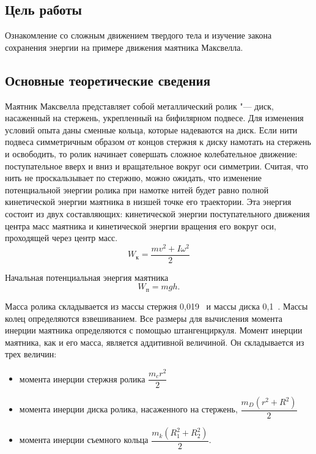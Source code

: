 \documentclass[a4paper, 12pt]{extarticle}
\begin{document}
\MTDTitlePage
\MTDInfoPage

\setcounter{section}{10}

\subsection{Цель работы}
Ознакомление со сложным движением твердого тела и изучение закона сохранения энергии на примере движения маятника Максвелла. 

\subsection{Основные теоретические сведения}
Маятник Максвелла представляет собой металлический ролик "--- диск, насаженный на стержень, укрепленный на бифилярном  подвесе. Для изменения условий опыта даны сменные кольца, которые надеваются на диск. Если нити подвеса симметричным образом от концов стержня к диску намотать на стержень и освободить, то ролик начинает совершать сложное колебательное движение: поступательное вверх и вниз и вращательное вокруг оси симметрии. Считая, что нить не проскальзывает по стержню, можно ожидать, что изменение потенциальной энергии ролика при намотке нитей будет равно полной кинетической энергии маятника в низшей точке его траектории. Эта энергия состоит из двух составляющих: кинетической энергии поступательного движения центра масс маятника и кинетической энергии вращения его вокруг оси, проходящей через центр масс. %
\[ %
W_\text{к} = \frac{mv^2 + I\omega^2}{2} %
\]

Начальная потенциальная энергия маятника %
\[
W_\text{п} = mgh.
\]

Масса ролика складывается из массы стержня 0,019~ и массы диска 0,1~. Массы колец определяются взвешиванием. Все размеры для вычисления момента инерции маятника определяются с помощью штангенциркуля. Момент инерции маятника, как и его масса, является аддитивной величиной. Он складывается из трех величин: %
\begin{itemize}
\item момента инерции стержня ролика $\dfrac{m_c r^2}{2}$
\item момента инерции диска ролика, насаженного на стержень, $\dfrac{m_D (r^2 + R^2)}{2}$
\item момента инерции съемного кольца $\dfrac{m_k(R_1^2 + R_2^2)}{2}$. 
\end{itemize}
\end{document}
